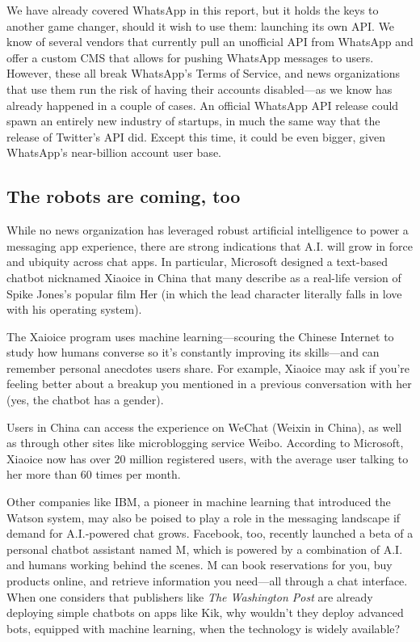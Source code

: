 \documentclass[notoc, symmetric, nobib, nols]{towcenter-guideto-book}
\begin{document}
We have already covered WhatsApp in this report, but it holds the keys to another game changer, should it wish to use them: launching its own API. We know of several vendors that currently pull an unofficial API from WhatsApp and offer a custom CMS that allows for pushing WhatsApp messages to users. However, these all break WhatsApp's Terms of Service, and news organizations that use them run the risk of having their accounts disabled---as we know has already happened in a couple of cases. An official WhatsApp API release could spawn an entirely new industry of startups, in much the same way that the release of Twitter's API did. Except this time, it could be even bigger, given WhatsApp's near-billion account user base.

\subsection{The robots are coming, too}

While no news organization has leveraged robust artificial intelligence to power a messaging app experience, there are strong indications that A.I. will grow in force and ubiquity across chat apps. In particular, Microsoft designed a text-based chatbot nicknamed Xiaoice in China that many describe as a real-life version of Spike Jones's popular film Her (in which the lead character literally falls in love with his operating system).  

The Xaioice program uses machine learning---scouring the Chinese Internet to study how humans converse so it's constantly improving its skills---and can remember personal anecdotes users share. For example, Xiaoice may ask if you're feeling better about a breakup you mentioned in a previous conversation with her (yes, the chatbot has a gender).

Users in China can access the experience on WeChat (Weixin in China), as well as through other sites like microblogging service Weibo. According to Microsoft, Xiaoice now has over 20 million registered users, with the average user talking to her more than 60 times per month.\autocite{BingXiaoIce} 

Other companies like IBM, a pioneer in machine learning that introduced the Watson system, may also be poised to play a role in the messaging landscape if demand for A.I.-powered chat grows. Facebook, too, recently launched a beta of a personal chatbot assistant named M, which is powered by a combination of A.I. and humans working behind the scenes. M can book reservations for you, buy products online, and retrieve information you need---all through a chat interface. When one considers that publishers like \textit{The Washington Post} are already deploying simple chatbots on apps like Kik, why wouldn't they deploy advanced bots, equipped with machine learning, when the technology is widely available?
\end{document}

